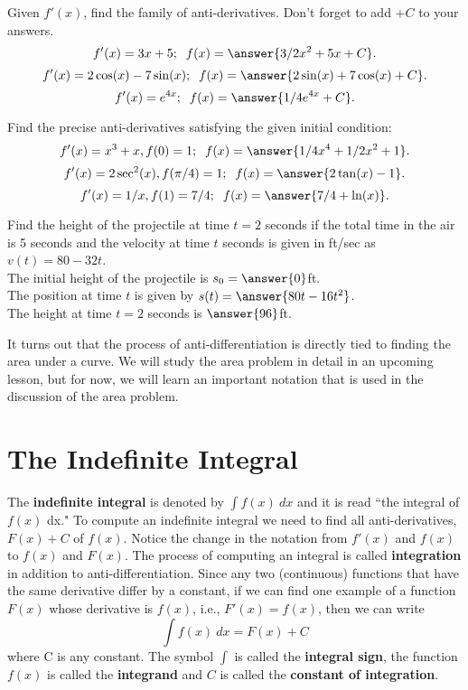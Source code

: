 \documentclass{ximera}
\begin{document}
\begin{problem}
Given $f'(x)$, find the family of anti-derivatives. Don't forget to add $+C$ to your answers.
\[
f'(x) = 3x + 5; \;\; f(x) = \answer{3/2x^2 + 5x +C}.
\]
\[
f'(x) = 2\cos(x) - 7\sin(x); \;\; f(x) = \answer{2\sin(x) + 7\cos(x) +C}.
\]
\[
f'(x) = e^{4x}; \;\; f(x) = \answer{1/4e^{4x} +C}.
\]

\end{problem}



\begin{problem}
Find the precise anti-derivatives satisfying the given initial condition:
\[
f'(x) = x^3 + x, f(0) = 1;\;\; f(x) = \answer{1/4x^4 + 1/2x^2 + 1}.
\]
\[
f'(x) = 2\sec^2(x), f(\pi/4) = 1; \;\; f(x) = \answer{2\tan(x) - 1}.
\]
\[
f'(x) = 1/x, f(1) = 7/4; \;\; f(x) = \answer{7/4 + \ln(x)}.
\]

\end{problem}



\begin{problem}
Find the height of the projectile at time $t = 2$ seconds if the total time in the air is 5 seconds 
and the velocity at time $t$ seconds is given in ft/sec as $v(t) = 80-32t$.\\
The initial height of the projectile is $s_0 = \answer{0}$ft.\\
The position at time $t$ is given by $s(t) = \answer{80t - 16t^2}$.\\
The height at time $t = 2$ seconds is $\answer{96}$ft.\\
\end{problem}



It turns out that the process of anti-differentiation is directly tied to finding the area under a curve.
We will study the area problem in detail in an upcoming lesson, but for now, we will learn an important notation that
is used in the discussion of the area problem.



\section{The Indefinite Integral}

The \textbf{indefinite integral} is denoted by $\int f(x) \ dx$ and it is read ``the integral of $f(x)$ dx." To compute an indefinite integral we need to 
find all anti-derivatives, $F(x) + C$ of $f(x)$. Notice the change in the notation from $f'(x)$ and $f(x)$
to $f(x)$ and $F(x)$. The process of computing an integral is called \textbf{integration} in addition to anti-differentiation.  
Since any two (continuous) functions that have the same derivative differ by a constant, 
if we can find one example of a function $F(x)$ whose derivative is $f(x)$, i.e., $F'(x) = f(x)$, then we can write
\[\int f(x) \ dx = F(x) + C\]
where C is any constant.  The symbol $\int$ is called the \textbf{integral sign}, 
the function $f(x)$ is called the \textbf{integrand} and $C$ is called the \textbf{constant of integration}.  
\end{document}
